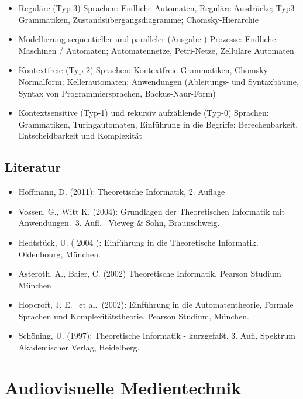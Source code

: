 \begin{itemize}
\tightlist
\item
  Reguläre (Typ-3) Sprachen: Endliche Automaten, Reguläre Ausdrücke;
  Typ3-Grammatiken, Zustandsübergangsdiagramme; Chomsky-Hierarchie
\item
  Modellierung sequentieller und paralleler (Ausgabe-) Prozesse:
  Endliche Maschinen / Automaten; Automatennetze, Petri-Netze, Zelluläre
  Automaten
\item
  Kontextfreie (Typ-2) Sprachen: Kontextfreie Grammatiken,
  Chomsky-Normalform; Kellerautomaten; Anwendungen (Ableitungs- und
  Syntaxbäume, Syntax von Programmiersprachen, Backus-Naur-Form)
\item
  Kontextsensitive (Typ-1) und rekursiv aufzählende (Typ-0) Sprachen:
  Grammatiken, Turingautomaten, Einführung in die Begriffe:
  Berechenbarkeit, Entscheidbarkeit und Komplexität
\end{itemize}

\hypertarget{literaturpathlabelmi-2017modulbeschreibungen-bachelorba_theoretischeinformatik2}{%
\section*{Literatur\label{/mi-2017/modulbeschreibungen-bachelor/BA_TheoretischeInformatik2}}\label{literaturpathlabelmi-2017modulbeschreibungen-bachelorba_theoretischeinformatik2}}

\begin{itemize}
\tightlist
\item
  Hoffmann, D. (2011): Theoretische Informatik, 2. Auflage
\item
  Vossen, G., Witt K. (2004): Grundlagen der Theoretischen Informatik
  mit Anwendungen.~3. Aufl.~ Vieweg \& Sohn, Braunschweig.
\item
  Hedtstück, U. ( 2004 ): Einführung in die Theoretische Informatik.
  Oldenbourg, München.
\item
  Asteroth, A., Baier, C. (2002) Theoretische Informatik. Pearson
  Studium München
\item
  Hopcroft, J. E.~ et al.~(2002): Einführung in die Automatentheorie,
  Formale Sprachen und Komplexitätstheorie. Pearson Studium, München.
\item
  Schöning, U. (1997): Theoretische Informatik - kurzgefaßt. 3. Aufl.
  Spektrum Akademischer Verlag, Heidelberg.
\end{itemize}

\hypertarget{audiovisuelle-medientechnikpathlabelmi-2017modulbeschreibungen-bachelorba_vc-audiovisuelle-medientechnik}{%
\chapter{Audiovisuelle
Medientechnik\label{/mi-2017/modulbeschreibungen-bachelor/BA_VC-audiovisuelle-medientechnik}}\label{audiovisuelle-medientechnikpathlabelmi-2017modulbeschreibungen-bachelorba_vc-audiovisuelle-medientechnik}}


